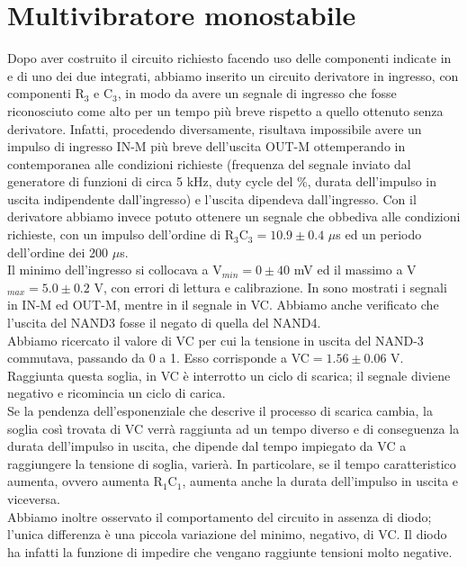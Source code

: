 \section{Multivibratore monostabile}
Dopo aver costruito il circuito richiesto facendo uso delle componenti indicate in  e di uno dei due integrati, abbiamo inserito un circuito derivatore in ingresso, con componenti R$_3$ e C$_3$, in modo da avere un segnale di ingresso che fosse riconosciuto come alto per un tempo più breve rispetto a quello ottenuto senza derivatore. Infatti, procedendo diversamente, risultava impossibile avere un impulso di ingresso IN-M più breve dell'uscita OUT-M ottemperando in contemporanea alle condizioni richieste (frequenza del segnale inviato dal generatore di funzioni di circa 5 kHz, duty cycle del \%, durata dell'impulso in uscita indipendente dall'ingresso) e l'uscita dipendeva dall'ingresso. Con il derivatore abbiamo invece potuto ottenere un segnale che obbediva alle condizioni richieste, con un impulso dell'ordine di R$_3 $C$_3 = 10.9 \pm 0.4$ $\mu$s ed un periodo dell'ordine dei 200 $\mu$s.\\
Il minimo dell'ingresso si collocava a V$_{min} = 0 \pm 40$ mV ed il massimo a V$_{max} = 5.0 \pm 0.2$ V, con errori di lettura e calibrazione. In  sono mostrati i segnali in IN-M ed OUT-M, mentre in  il segnale in VC. Abbiamo anche verificato che l'uscita del NAND3 fosse il negato di quella del NAND4.\\ 
Abbiamo ricercato il valore di VC per cui la tensione in uscita del NAND-3 commutava, passando da 0 a 1. Esso corrisponde a VC$ = 1.56 \pm 0.06$ V. Raggiunta questa soglia, in VC è interrotto un ciclo di scarica; il segnale diviene negativo e ricomincia un ciclo di carica.\\
Se la pendenza dell'esponenziale che descrive il processo di scarica cambia, la soglia così trovata di VC verrà raggiunta ad un tempo diverso e di conseguenza la durata dell'impulso in uscita, che dipende dal tempo impiegato da VC a raggiungere la tensione di soglia, varierà. In particolare, se il tempo caratteristico aumenta, ovvero aumenta R$_1$C$_1$, aumenta anche la durata dell'impulso in uscita e viceversa.\\
Abbiamo inoltre osservato il comportamento del circuito in assenza di diodo; l'unica differenza è una piccola variazione del minimo, negativo, di VC. Il diodo ha infatti la funzione di impedire che vengano raggiunte tensioni molto negative.\\
